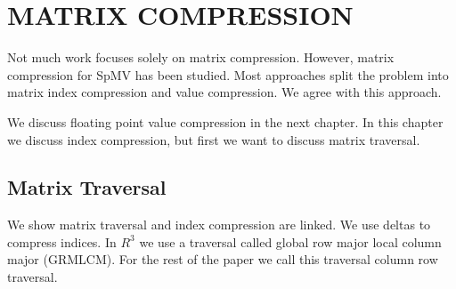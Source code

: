 \chapter{MATRIX COMPRESSION}
\label{chapter:compression}
Not much work focuses solely on matrix compression. However, matrix compression for SpMV has been studied. Most approaches split the problem into matrix index compression and value compression. We agree with this approach.
\par We discuss floating point value compression in the next chapter. In this chapter we discuss index compression, but first we want to discuss matrix traversal.
\section{Matrix Traversal}
We show matrix traversal and index compression are linked. We use deltas to compress indices. In $R^3$ we use a traversal called global row major local column major (GRMLCM). For the rest of the paper we call this traversal column row traversal.
